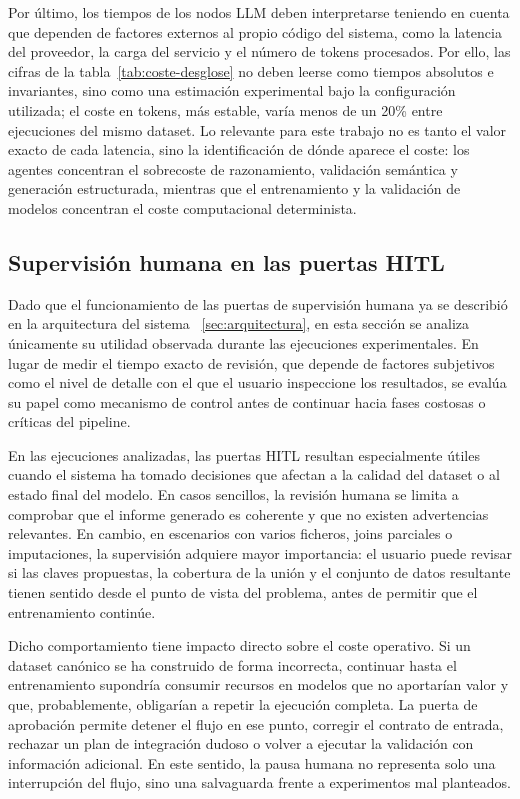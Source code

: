 \documentclass[12pt,a4paper]{article}
\theoremstyle{plain}
\begin{document}
Por último, los tiempos de los nodos LLM deben interpretarse teniendo en cuenta que dependen de
factores externos al propio código del sistema, como la latencia del proveedor, la carga del
servicio y el número de tokens procesados. Por ello, las cifras de la tabla~\ref{tab:coste-desglose}
no deben leerse como tiempos absolutos e invariantes, sino como una estimación experimental bajo la
configuración utilizada; el coste en tokens, más estable, varía menos de un 20\% entre ejecuciones
del mismo dataset. Lo relevante para este trabajo no es tanto el valor exacto de cada latencia, sino
la identificación de dónde aparece el coste: los agentes concentran el sobrecoste de razonamiento,
validación semántica y generación estructurada, mientras que el entrenamiento y la validación de
modelos concentran el coste computacional determinista.




\subsection{Supervisión humana en las puertas HITL}
\label{sec:coste-hitl}

Dado que el funcionamiento de las puertas de supervisión humana ya se describió en la arquitectura del sistema ~\ref{sec:arquitectura}, en esta sección se analiza únicamente su utilidad observada durante las ejecuciones experimentales. En lugar de medir el tiempo exacto de revisión, que depende de factores subjetivos como el nivel de detalle con el que el usuario inspeccione los resultados, se evalúa su papel como mecanismo de control antes de continuar hacia fases costosas o críticas del pipeline.

En las ejecuciones analizadas, las puertas HITL resultan especialmente útiles cuando el sistema ha tomado decisiones que afectan a la calidad del dataset o al estado final del modelo. En casos sencillos, la revisión humana se limita a comprobar que el informe generado es coherente y que no existen advertencias relevantes. En cambio, en escenarios con varios ficheros, joins parciales o imputaciones, la supervisión adquiere mayor importancia: el usuario puede revisar si las claves propuestas, la cobertura de la unión y el conjunto de datos resultante tienen sentido desde el punto de vista del problema, antes de permitir que el entrenamiento continúe. %

Dicho comportamiento tiene impacto directo sobre el coste operativo. Si un dataset canónico se ha construido de forma incorrecta, continuar hasta el entrenamiento supondría consumir recursos en modelos que no aportarían valor y que, probablemente, obligarían a repetir la ejecución completa. La puerta de aprobación permite detener el flujo en ese punto, corregir el contrato de entrada, rechazar un plan de integración dudoso o volver a ejecutar la validación con información adicional. En este sentido, la pausa humana no representa solo una interrupción del flujo, sino una salvaguarda frente a experimentos mal planteados.
\end{document}
